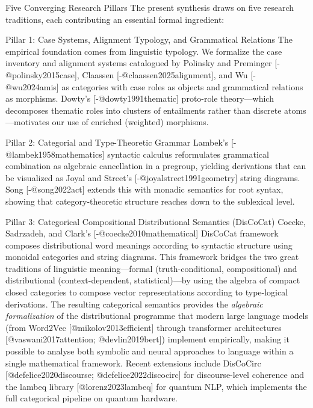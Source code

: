 \documentclass[
  ignorenonframetext,
]{beamer}
\begin{document}
\begin{frame}{Five Converging Research Pillars}
\protect{}\label{five-converging-research-pillars}
The present synthesis draws on five research traditions, each
contributing an essential formal ingredient:

\begin{block}{Pillar 1: Case Systems, Alignment Typology, and
Grammatical Relations}
\protect{}\label{pillar-1-case-systems-alignment-typology-and-grammatical-relations}
The empirical foundation comes from linguistic typology. We formalize
the case inventory and alignment systems catalogued by Polinsky and
Preminger {[}-@polinsky2015case{]}, Claassen
{[}-@claassen2025alignment{]}, and Wu {[}-@wu2024amis{]} as categories
with case roles as objects and grammatical relations as morphisms.
Dowty's {[}-@dowty1991thematic{]} proto-role theory---which decomposes
thematic roles into clusters of entailments rather than discrete
atoms---motivates our use of enriched (weighted) morphisms.
\end{block}

\begin{block}{Pillar 2: Categorial and Type-Theoretic Grammar}
\protect{}\label{pillar-2-categorial-and-type-theoretic-grammar}
Lambek's {[}-@lambek1958mathematics{]} syntactic calculus reformulates
grammatical combination as algebraic cancellation in a pregroup,
yielding derivations that can be visualized as Joyal and Street's
{[}-@joyalstreet1991geometry{]} string diagrams. Song
{[}-@song2022act{]} extends this with monadic semantics for root syntax,
showing that category-theoretic structure reaches down to the sublexical
level.
\end{block}

\begin{block}{Pillar 3: Categorical Compositional Distributional
Semantics (DisCoCat)}
\protect{}\label{pillar-3-categorical-compositional-distributional-semantics-discocat}
Coecke, Sadrzadeh, and Clark's {[}-@coecke2010mathematical{]} DisCoCat
framework composes distributional word meanings according to syntactic
structure using monoidal categories and string diagrams. This framework
bridges the two great traditions of linguistic meaning---formal
(truth-conditional, compositional) and distributional
(context-dependent, statistical)---by using the algebra of compact
closed categories to compose vector representations according to
type-logical derivations. The resulting categorical semantics provides
the \emph{algebraic formalization} of the distributional programme that
modern large language models (from Word2Vec {[}@mikolov2013efficient{]}
through transformer architectures {[}@vaswani2017attention;
@devlin2019bert{]}) implement empirically, making it possible to analyse
both symbolic and neural approaches to language within a single
mathematical framework. Recent extensions include DisCoCirc
{[}@defelice2020discourse; @defelice2022discocirc{]} for discourse-level
coherence and the lambeq library {[}@lorenz2023lambeq{]} for quantum
NLP, which implements the full categorical pipeline on quantum hardware.
\end{block}


\end{frame}
\end{document}
